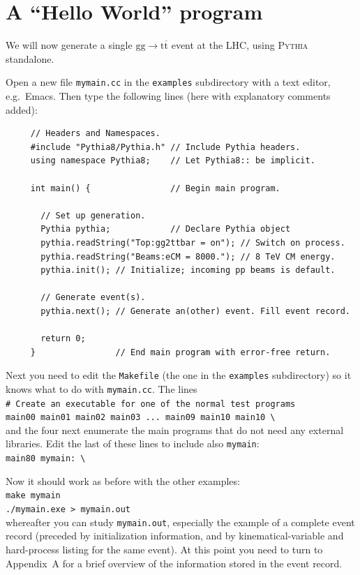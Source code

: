 \documentclass[12pt,a4paper]{article}
\newcommand{\g}{{\mathrm g}}
\renewcommand{\t}{{\mathrm t}}
\newcommand{\tbar}{\overline{\mathrm t}}
\begin{document}
\section{A ``Hello World'' program}

We will now generate a single $\g \g \to \t \tbar$ event at the LHC,
using \textsc{Pythia} standalone.

Open a new file \texttt{mymain.cc} in the \texttt{examples} subdirectory 
with a text editor, e.g.\ Emacs. Then type the following lines 
(here with explanatory comments added):
\begin{verbatim}
     // Headers and Namespaces.
     #include "Pythia8/Pythia.h" // Include Pythia headers.
     using namespace Pythia8;    // Let Pythia8:: be implicit.

     int main() {                // Begin main program.

       // Set up generation.
       Pythia pythia;            // Declare Pythia object
       pythia.readString("Top:gg2ttbar = on"); // Switch on process.
       pythia.readString("Beams:eCM = 8000."); // 8 TeV CM energy.      
       pythia.init(); // Initialize; incoming pp beams is default.

       // Generate event(s).
       pythia.next(); // Generate an(other) event. Fill event record.

       return 0;
     }                // End main program with error-free return.
\end{verbatim}

Next you need to edit the \texttt{Makefile} (the one in the \texttt{examples} 
subdirectory) so it knows what to do with \texttt{mymain.cc}.
The lines\\
\hspace*{10mm}\texttt{\# Create an executable for one of the normal test 
programs}\\
\hspace*{10mm}\texttt{main00  main01 main02 main03 ... main09 main10 
main10}~\verb+\+ \\
and the four next enumerate the main programs that do not need any 
external libraries. Edit the last of these lines to include also 
\texttt{mymain}:\\
\hspace*{10mm}\texttt{main80 mymain:}~\verb+\+

Now it should work as before with the other examples:\\
\hspace*{10mm}\texttt{make mymain}\\
\hspace*{10mm}\texttt{./mymain.exe > mymain.out}\\
whereafter you can study \texttt{mymain.out}, especially the 
example of a complete event record (preceded by initialization information,
and by kinematical-variable and hard-process listing for the same event). 
At this point you need to turn to Appendix~A for a brief overview of the 
information stored in the event record. 
\end{document}
